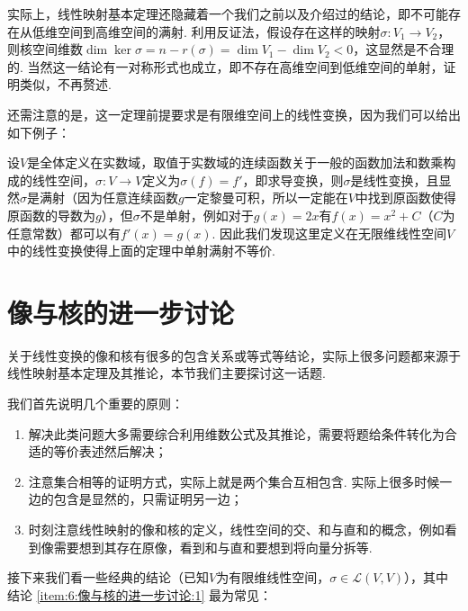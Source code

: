 实际上，线性映射基本定理还隐藏着一个我们之前以及介绍过的结论，即不可能存在从低维空间到高维空间的满射. 利用反证法，假设存在这样的映射$\sigma:V_1\to V_2$，则核空间维数$\dim\ker\sigma=n-r(\sigma)=\dim V_1-\dim V_2<0$，这显然是不合理的. 当然这一结论有一对称形式也成立，即不存在高维空间到低维空间的单射，证明类似，不再赘述.

还需注意的是，这一定理前提要求是有限维空间上的线性变换，因为我们可以给出如下例子：

\begin{example}
    设$V$是全体定义在实数域，取值于实数域的连续函数关于一般的函数加法和数乘构成的线性空间，$\sigma:V\to V$定义为$\sigma(f)=f'$，即求导变换，则$\sigma$是线性变换，且显然$\sigma$是满射（因为任意连续函数$g$一定黎曼可积，所以一定能在$V$中找到原函数使得原函数的导数为$g$），但$\sigma$不是单射，例如对于$g(x)=2x$有$f(x)=x^2+C$（$C$为任意常数）都可以有$f'(x)=g(x)$. 因此我们发现这里定义在无限维线性空间$V$中的线性变换使得上面的定理中单射满射不等价.
\end{example}

\section{像与核的进一步讨论}

关于线性变换的像和核有很多的包含关系或等式等结论，实际上很多问题都来源于线性映射基本定理及其推论，本节我们主要探讨这一话题.

我们首先说明几个重要的原则：
\begin{enumerate}
    \item 解决此类问题大多需要综合利用维数公式及其推论，需要将题给条件转化为合适的等价表述然后解决；

    \item 注意集合相等的证明方式，实际上就是两个集合互相包含. 实际上很多时候一边的包含是显然的，只需证明另一边；

    \item 时刻注意线性映射的像和核的定义，线性空间的交、和与直和的概念，例如看到像需要想到其存在原像，看到和与直和要想到将向量分拆等.
\end{enumerate}

接下来我们看一些经典的结论（已知$V$为有限维线性空间，$\sigma\in \mathcal{L}(V,V)$），其中结论 \ref*{item:6:像与核的进一步讨论:1} 最为常见：

